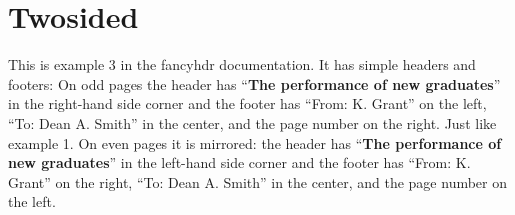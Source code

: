 \documentclass[twoside]{article}
\begin{document}
\section*{Twosided}
\label{sec:twosided}

\begin{boxedminipage}{\textwidth}
This is example 3 in the fancyhdr documentation. It has simple headers and footers:
On odd pages the header has {``\textbf{The performance of new graduates}''} in the right-hand side corner and the footer has ``From: K. Grant'' on the left, ``To: Dean A. Smith'' in the center, and the page number on the right. Just like example 1. On even pages it is mirrored:  the header has {``\textbf{The performance of new graduates}''} in the left-hand side corner and the footer has ``From: K. Grant'' on the right, ``To: Dean A. Smith'' in the center, and the page number on the left.
\end{boxedminipage}

\bigskip

\lipsum
\end{document}
